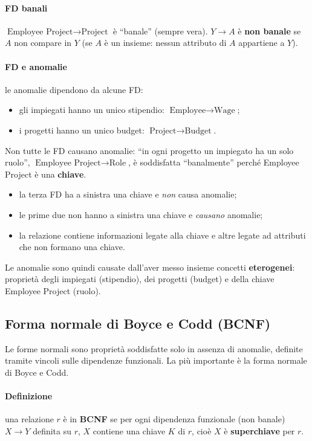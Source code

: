 \documentclass[a4paper,12pt]{article}
\begin{document}
\paragraph{FD banali} $\text{Employee Project} \to \text{Project}$ è
``banale'' (sempre vera). $Y \to A$ è \textbf{non banale} se $A$ non compare
in $Y$ (se $A$ è un insieme: nessun attributo di $A$ appartiene a $Y$).

\paragraph{FD e anomalie} le anomalie dipendono da alcune FD:
\begin{itemize}
  \item gli impiegati hanno un unico stipendio: $\text{Employee} \to
    \text{Wage}$;
  \item i progetti hanno un unico budget: $\text{Project} \to \text{Budget}$.
\end{itemize}
Non tutte le FD causano anomalie: ``in ogni progetto un impiegato ha un solo
ruolo'', $\text{Employee Project} \to \text{Role}$, è soddisfatta
``banalmente'' perché Employee Project è una \textbf{chiave}.
\begin{itemize}
  \item la terza FD ha a sinistra una chiave e \emph{non} causa anomalie;
  \item le prime due non hanno a sinistra una chiave e \emph{causano}
    anomalie;
  \item la relazione contiene informazioni legate alla chiave e altre legate
    ad attributi che non formano una chiave.
\end{itemize}
Le anomalie sono quindi causate dall'aver messo insieme concetti
\textbf{eterogenei}: proprietà degli impiegati (stipendio), dei progetti
(budget) e della chiave Employee Project (ruolo).

\subsection{Forma normale di Boyce e Codd (BCNF)}

Le forme normali sono proprietà soddisfatte solo in assenza di anomalie,
definite tramite vincoli sulle dipendenze funzionali. La più importante è la
forma normale di Boyce e Codd.

\paragraph{Definizione} una relazione $r$ è in \textbf{BCNF} se per ogni
dipendenza funzionale (non banale) $X \to Y$ definita su $r$, $X$ contiene una
chiave $K$ di $r$, cioè $X$ è \textbf{superchiave} per $r$.
\end{document}
